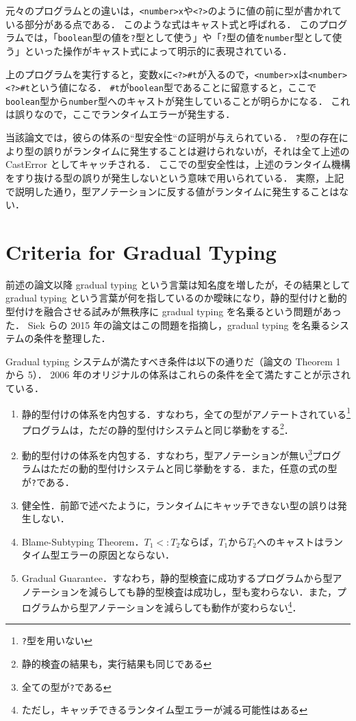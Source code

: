 元々のプログラムとの違いは，\texttt{<number>x}や\texttt{<?>}のように値の前に型が書かれている部分がある点である．
このような式はキャスト式と呼ばれる．
このプログラムでは，「\texttt{boolean}型の値を\texttt{?}型として使う」や「\texttt{?}型の値を\texttt{number}型として使う」といった操作がキャスト式によって明示的に表現されている．

上のプログラムを実行すると，変数\texttt{x}に\texttt{<?>\#t}が入るので，\texttt{<number>x}は\texttt{<number><?>\#t}という値になる．
\texttt{\#t}が\texttt{boolean}型であることに留意すると，ここで\texttt{boolean}型から\texttt{number}型へのキャストが発生していることが明らかになる．
これは誤りなので，ここでランタイムエラーが発生する．

当該論文では，彼らの体系の“型安全性“の証明が与えられている．
\texttt{?}型の存在により型の誤りがランタイムに発生することは避けられないが，それは全て上述の CastError としてキャッチされる．
ここでの型安全性は，上述のランタイム機構をすり抜ける型の誤りが発生しないという意味で用いられている．
実際，上記で説明した通り，型アノテーションに反する値がランタイムに発生することはない．

\section{Criteria for Gradual Typing}

前述の論文以降 gradual typing という言葉は知名度を増したが，その結果として gradual typing という言葉が何を指しているのか曖昧になり，静的型付けと動的型付けを融合させる試みが無秩序に gradual typing を名乗るという問題があった．
Siek ら\cite{siek_et_al:LIPIcs.SNAPL.2015.274}の 2015 年の論文はこの問題を指摘し，gradual typing を名乗るシステムの条件を整理した．

Gradual typing システムが満たすべき条件は以下の通りだ（論文の Theorem 1 から 5）．
2006 年のオリジナルの体系はこれらの条件を全て満たすことが示されている．

\begin{enumerate}
    \item 静的型付けの体系を内包する．すなわち，全ての型がアノテートされている\footnote{\texttt{?}型を用いない}プログラムは，ただの静的型付けシステムと同じ挙動をする\footnote{静的検査の結果も，実行結果も同じである}．
    \item 動的型付けの体系を内包する．すなわち，型アノテーションが無い\footnote{全ての型が\texttt{?}である}プログラムはただの動的型付けシステムと同じ挙動をする．また，任意の式の型が\texttt{?}である．
    \item 健全性．前節で述べたように，ランタイムにキャッチできない型の誤りは発生しない．
    \item Blame-Subtyping Theorem．$T_1 <: T_2$ならば，$T_1$から$T_2$へのキャストはランタイム型エラーの原因とならない．
    \item Gradual Guarantee．すなわち，静的型検査に成功するプログラムから型アノテーションを減らしても静的型検査は成功し，型も変わらない．また，プログラムから型アノテーションを減らしても動作が変わらない\footnote{ただし，キャッチできるランタイム型エラーが減る可能性はある}．
\end{enumerate}

